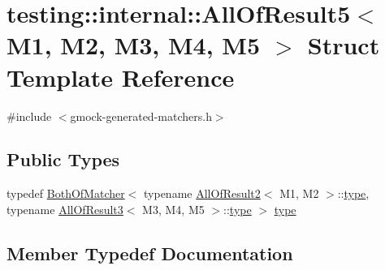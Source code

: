\hypertarget{structtesting_1_1internal_1_1_all_of_result5}{}\section{testing\+:\+:internal\+:\+:All\+Of\+Result5$<$ M1, M2, M3, M4, M5 $>$ Struct Template Reference}
\label{structtesting_1_1internal_1_1_all_of_result5}


{\ttfamily \#include $<$gmock-\/generated-\/matchers.\+h$>$}

\subsection*{Public Types}
\begin{DoxyCompactItemize}
\item 
typedef \hyperlink{classtesting_1_1internal_1_1_both_of_matcher}{Both\+Of\+Matcher}$<$ typename \hyperlink{structtesting_1_1internal_1_1_all_of_result2}{All\+Of\+Result2}$<$ M1, M2 $>$\+::\hyperlink{structtesting_1_1internal_1_1_all_of_result5_aee2e1fb803f428741d147347b692d108}{type}, typename \hyperlink{structtesting_1_1internal_1_1_all_of_result3}{All\+Of\+Result3}$<$ M3, M4, M5 $>$\+::\hyperlink{structtesting_1_1internal_1_1_all_of_result5_aee2e1fb803f428741d147347b692d108}{type} $>$ \hyperlink{structtesting_1_1internal_1_1_all_of_result5_aee2e1fb803f428741d147347b692d108}{type}
\end{DoxyCompactItemize}


\subsection{Member Typedef Documentation}
\mbox{\label{structtesting_1_1internal_1_1_all_of_result5_aee2e1fb803f428741d147347b692d108}} 
